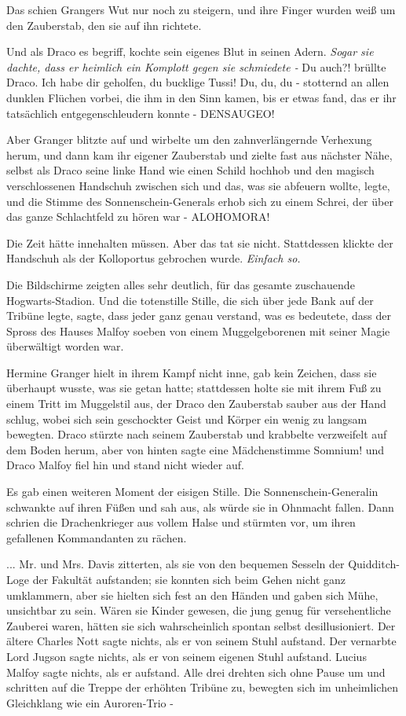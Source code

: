 Das schien Grangers Wut nur noch zu steigern, und ihre Finger wurden weiß um den
Zauberstab, den sie auf ihn richtete.

Und als Draco es begriff, kochte sein eigenes Blut in seinen Adern. \emph{Sogar
sie dachte, dass er heimlich ein Komplott gegen sie schmiedete -} \glqq Du
auch?!\grqq{} brüllte Draco. \glqq Ich habe dir geholfen, du bucklige Tussi! Du,
du, du\grqq{} - stotternd an allen dunklen Flüchen vorbei, die ihm in den Sinn
kamen, bis er etwas fand, das er ihr tatsächlich entgegenschleudern konnte -
\glqq DENSAUGEO!\grqq{}

Aber Granger blitzte auf und wirbelte um den zahnverlängernde Verhexung herum,
und dann kam ihr eigener Zauberstab und zielte fast aus nächster Nähe, selbst
als Draco seine linke Hand wie einen Schild hochhob und den magisch
verschlossenen Handschuh zwischen sich und das, was sie abfeuern wollte, legte,
und die Stimme des Sonnenschein-Generals erhob sich zu einem Schrei, der über
das ganze Schlachtfeld zu hören war - \glqq ALOHOMORA!\grqq{}

Die Zeit hätte innehalten müssen. Aber das tat sie nicht. Stattdessen klickte
der Handschuh als der Kolloportus gebrochen wurde.
\emph{Einfach so.}

Die Bildschirme zeigten alles sehr deutlich, für das gesamte zuschauende
Hogwarts-Stadion. Und die totenstille Stille, die sich über jede Bank auf der
Tribüne legte, sagte, dass jeder ganz genau verstand, was es bedeutete, dass der
Spross des Hauses Malfoy soeben von einem Muggelgeborenen mit seiner Magie
überwältigt worden war.

Hermine Granger hielt in ihrem Kampf nicht inne, gab kein Zeichen, dass sie
überhaupt wusste, was sie getan hatte; stattdessen holte sie mit ihrem Fuß zu
einem Tritt im Muggelstil aus, der Draco den Zauberstab sauber aus der Hand
schlug, wobei sich sein geschockter Geist und Körper ein wenig zu langsam
bewegten. Draco stürzte nach seinem Zauberstab und krabbelte verzweifelt auf dem
Boden herum, aber von hinten sagte eine Mädchenstimme \glqq Somnium!\grqq{} und
Draco Malfoy fiel hin und stand nicht wieder auf.

Es gab einen weiteren Moment der eisigen Stille. Die Sonnenschein-Generalin
schwankte auf ihren Füßen und sah aus, als würde sie in Ohnmacht fallen. Dann
schrien die Drachenkrieger aus vollem Halse und stürmten vor, um ihren
gefallenen Kommandanten zu rächen.

... Mr. und Mrs. Davis zitterten, als sie von den bequemen Sesseln der
Quidditch-Loge der Fakultät aufstanden; sie konnten sich beim Gehen nicht ganz
umklammern, aber sie hielten sich fest an den Händen und gaben sich Mühe,
unsichtbar zu sein. Wären sie Kinder gewesen, die jung genug für versehentliche
Zauberei waren, hätten sie sich wahrscheinlich spontan selbst desillusioniert.
Der ältere Charles Nott sagte nichts, als er von seinem Stuhl aufstand. Der
vernarbte Lord Jugson sagte nichts, als er von seinem eigenen Stuhl aufstand.
Lucius Malfoy sagte nichts, als er aufstand. Alle drei drehten sich ohne Pause
um und schritten auf die Treppe der erhöhten Tribüne zu, bewegten sich im
unheimlichen Gleichklang wie ein Auroren-Trio -

